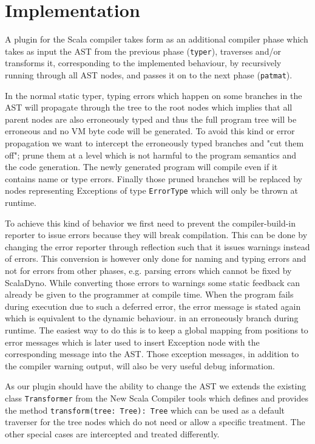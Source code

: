 \section{Implementation}

A plugin for the Scala compiler takes form as an additional compiler phase which takes as input the AST from the previous phase (\texttt{typer}), traverses and/or transforms it, corresponding to the implemented behaviour, by recursively running through all AST nodes, and passes it on to the next phase (\texttt{patmat}).

In the normal static typer, typing errors which happen on some branches in the AST will propagate through the tree to the root nodes which implies that all parent nodes are also erroneously typed and thus the full program tree will be erroneous and no VM byte code will be generated. To avoid this kind or error propagation we want to intercept the erroneously typed branches and "cut them off"; prune them at a level which is not harmful to the program semantics and the code generation. The newly generated program will compile even if it contains name or type errors. Finally those pruned branches will be replaced by nodes representing Exceptions of type \texttt{ErrorType} which will only be thrown at runtime.

To achieve  this kind of behavior we first need to prevent the compiler-build-in reporter to issue errors because they will break compilation. This can be done by changing the error reporter through reflection such that it issues warnings instead of errors. This conversion is however only done for naming and typing errors and not for errors from other phases, e.g. parsing errors which cannot be fixed by ScalaDyno. While converting those errors to warnings some static feedback can already be given to the programmer at compile time. When the program fails during execution due to such a deferred error, the error message is stated again which is equivalent to the dynamic behaviour.
in an erroneously branch during runtime. The easiest way to do this is to keep a global mapping from positions to error messages which is later used to insert Exception node with the corresponding message into the AST. Those exception messages, in addition to the compiler warning output, will also be very useful debug information.

As our plugin should have the ability to change the AST we extends the existing class \texttt{Transformer} from the New Scala Compiler tools which defines and provides the method \texttt{transform(tree: Tree): Tree} which can be used as a default traverser for the tree nodes which do not need or allow a specific treatment. The other special cases are intercepted and treated differently.

